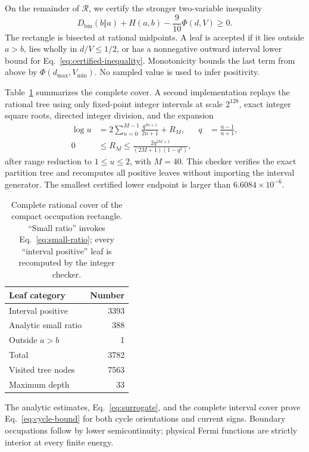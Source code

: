 \documentclass[aps,pra,reprint,superscriptaddress,nofootinbib,longbibliography,floatfix]{revtex4-2}
\newcommand{\Dkl}{D_{\mathrm{bin}}}
\newcommand{\PhiF}{\Phi}
\begin{document}
On the remainder of $\mathcal R$, we certify the stronger two-variable inequality
\begin{equation}
 \Dkl(b\Vert a)+H(a,b)-\frac9{10}\PhiF(d,V)\geq0.
 \label{eq:certified-inequality}
\end{equation}
The rectangle is bisected at rational midpoints.  A leaf is accepted if it lies outside $a>b$, lies wholly in $d/V\leq1/2$, or has a nonnegative outward interval lower bound for Eq.~\eqref{eq:certified-inequality}.  Monotonicity bounds the last term from above by $\PhiF(d_{\max},V_{\min})$.  No sampled value is used to infer positivity.

Table~\ref{tab:certificate} summarizes the complete cover.  A second implementation replays the rational tree using only fixed-point integer intervals at scale $2^{128}$, exact integer square roots, directed integer division, and the expansion
\begin{align}
 \log u&=2\sum_{n=0}^{M-1}\frac{q^{2n+1}}{2n+1}+R_M,
 &q&=\frac{u-1}{u+1},\nonumber\\
 0&\leq R_M\leq\frac{2q^{2M+1}}{(2M+1)(1-q^2)},
 \label{eq:logseries}
\end{align}
after range reduction to $1\leq u\leq2$, with $M=40$.  This checker verifies the exact partition tree and recomputes all positive leaves without importing the interval generator.  The smallest certified lower endpoint is larger than $6.6084\times10^{-6}$.

\begin{table}[t]
\caption{Complete rational cover of the compact occupation rectangle.  ``Small ratio'' invokes Eq.~\eqref{eq:small-ratio}; every ``interval positive'' leaf is recomputed by the integer checker.}
\label{tab:certificate}
\begin{ruledtabular}
\begin{tabular}{lr}
Leaf category & Number\\
\hline
Interval positive & 3393\\
Analytic small ratio & 388\\
Outside $a>b$ & 1\\
Total & 3782\\
Visited tree nodes & 7563\\
Maximum depth & 33
\end{tabular}
\end{ruledtabular}
\end{table}

The analytic estimates, Eq.~\eqref{eq:surrogate}, and the complete interval cover prove Eq.~\eqref{eq:cycle-bound} for both cycle orientations and current signs.  Boundary occupations follow by lower semicontinuity; physical Fermi functions are strictly interior at every finite energy.
\end{document}
